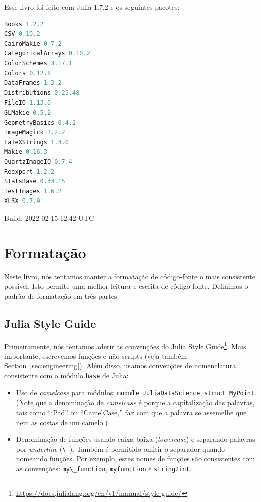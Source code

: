 \documentclass[
  notoc %
]{tufte-book}
\DeclareRobustCommand{\href}[2]{#2\footnote{\url{#1}}}
\providecommand{\tightlist}{%
  \setlength{\itemsep}{0pt}\setlength{\parskip}{0pt}
}
\newcommand{\passthrough}[1]{#1}
\begin{document}
Esse livro foi feito com Julia 1.7.2 e os seguintes pacotes:

\begin{lstlisting}[language=Julia]
Books 1.2.2
CSV 0.10.2
CairoMakie 0.7.2
CategoricalArrays 0.10.2
ColorSchemes 3.17.1
Colors 0.12.8
DataFrames 1.3.2
Distributions 0.25.48
FileIO 1.13.0
GLMakie 0.5.2
GeometryBasics 0.4.1
ImageMagick 1.2.2
LaTeXStrings 1.3.0
Makie 0.16.3
QuartzImageIO 0.7.4
Reexport 1.2.2
StatsBase 0.33.15
TestImages 1.6.2
XLSX 0.7.9
\end{lstlisting}

Build: 2022-02-15 12:42 UTC

\hypertarget{sec:notation}{%
\section{Formatação}\label{sec:notation}}

Neste livro, nós tentamos manter a formatação de código-fonte o mais
consistente possível. Isto permite uma melhor leitura e escrita de
código-fonte. Definimos o padrão de formatação em três partes.

\hypertarget{julia-style-guide}{%
\subsection{Julia Style Guide}\label{julia-style-guide}}

Primeiramente, nós tentamos aderir as convenções do
\href{https://docs.julialang.org/en/v1/manual/style-guide/}{Julia Style
Guide}. Mais importante, escrevemos funções e não scripts (veja também
Section~\ref{sec:engineering}). Além disso, usamos convenções de
nomenclatura consistente com o módulo \passthrough{\lstinline!base!} de
Julia:

\begin{itemize}
\tightlist
\item
  Uso de \emph{camelcase} para módulos:
  \passthrough{\lstinline!module JuliaDataScience!},
  \passthrough{\lstinline!struct MyPoint!}. (Note que a denominação de
  \emph{camelcase} é porque a capitalização das palavras, tais como
  ``iPad'' ou ``CamelCase,'' faz com que a palavra se assemelhe que nem
  as costas de um camelo.)
\item
  Denominação de funções usando caixa baixa (\emph{lowercase}) e
  separando palavras por \emph{underline}
  (\passthrough{\lstinline!\_!}). Também é permitido omitir o separador
  quando nomeando funções. Por exemplo, estes nomes de funções são
  consistentes com as convenções:
  \passthrough{\lstinline!my\_function!},
  \passthrough{\lstinline!myfunction!} e
  \passthrough{\lstinline!string2int!}.
\end{itemize}
\end{document}
